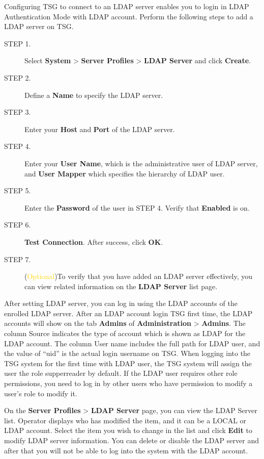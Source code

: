Configuring TSG to connect to an LDAP server enables you to login in LDAP Authentication Mode with LDAP account. Perform the following steps to add a LDAP server on TSG.


\begin{description}
    \item[STEP 1.]	Select \textbf{System} > \textbf{Server Profiles} > \textbf{LDAP Server} and click \textbf{Create}.
    \item[STEP 2.]	Define a \textbf{Name} to specify the LDAP server.
    \item[STEP 3.]	Enter your \textbf{Host} and \textbf{Port} of the LDAP server.
    \item[STEP 4.]	Enter your \textbf{User Name}, which is the administrative user of LDAP server, and \textbf{User Mapper} which specifies the hierarchy of LDAP user. 
    \item[STEP 5.]	Enter the \textbf{Password} of the user in STEP 4. Verify that \textbf{Enabled} is on.
    \item[STEP 6.]	\textbf{Test Connection}. After success, click \textbf{OK}.
    \item[STEP 7.]	(\textcolor{gold}{Optional})To verify that you have added an LDAP server effectively, you can view related information on the \textbf{LDAP Server} list page. 
\end{description}


After setting LDAP server, you can log in using the LDAP accounts of the enrolled LDAP server. 
After an LDAP account login TSG first time, the LDAP accounts will show on the tab \textbf{Admins} of \textbf{Administration} > \textbf{Admins}. 
The column Source indicates the type of account which is shown as LDAP for the LDAP account. 
The column User name includes the full path for LDAP user, and the value of “uid” is the actual login username on TSG. 
When logging into the TSG system for the first time with LDAP user, the TSG system will assign the user the role supperreader by default. 
If the LDAP user requires other role permissions, you need to log in by other users who have permission to modify a user’s role to modify it.


On the \textbf{Server Profiles} > \textbf{LDAP Server} page, you can view the LDAP Server list. Operator displays who has modified the item, and it can be a LOCAL or LDAP account. 
Select the item you wish to change in the list and click \textbf{Edit} to modify LDAP server information. 
You can delete or disable the LDAP server and after that you will not be able to log into the system with the LDAP account.

